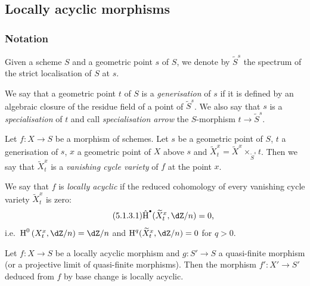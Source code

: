 \subsection{Locally acyclic morphisms}\label{I:5-1}





\subsubsection{Notation}\label{I:5-1-1}

Given a scheme $S$ and a geometric point $s$ of $S$, we
denote by $\widetilde S^s$ the spectrum of the strict localisation of $S$ at $s$. 





\begin{definition}\label{I:5-1-2}
We say that a geometric point $t$ of $S$ is a \emph{generisation} of
$s$ if it is defined by an algebraic closure of the residue field of a
point of $\widetilde S^s$. We also say that $s$ is a \emph{specialisation}
of $t$ and call \emph{specialisation arrow} the $S$-morphism
$t\to \widetilde S^s$.
\end{definition}





\begin{definition}\label{I:5-1-3}
Let $f:X\to S$ be a morphism of schemes. Let $s$ be a geometric point of
$S$, $t$ a generisation of $s$, $x$ a geometric point of $X$
above $s$ and
$\widetilde X_t^x = \widetilde X^x\times_{\widetilde S^s} t$. Then we say that
$\widetilde X_t^x$ is a \emph{vanishing cycle variety} of $f$ at
the point $x$.

We say that $f$ is \emph{locally acyclic} if the reduced cohomology of
every vanishing cycle variety $\widetilde X_t^x$ is zero:
\begin{equation*}\tag{5.1.3.1}\label{I:eq:5-1-3-1}
  \hat\h^\bullet(\widetilde X_t^x,\dZ/n) = 0\text{,}
\end{equation*}
i.e.\ $\h^0\left(X_t^x,\dZ/n\right) = \dZ/n$ and
$\h^q(\widetilde X_t^x,\dZ/n) = 0$ for $q>0$.
\end{definition}





\begin{lemma}\label{I:5-1-4}
Let $f:X\to S$ be a locally acyclic morphism and $g:S'\to S$ a
quasi-finite morphism (or a projective limit of quasi-finite morphisms). Then
the morphism $f':X'\to S'$ deduced from $f$ by base change is locally
acyclic.
\end{lemma}

